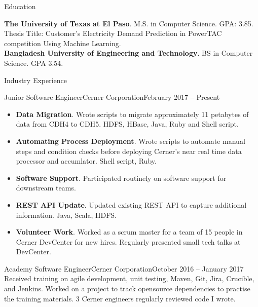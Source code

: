 \documentclass[]{mcdowellcv}
\begin{document}
	\makeheader
	
	
	\begin{cvsection}{Education}
		\begin{cvsubsection}{}{}{}
				\textbf{The University of Texas at El Paso}. M.S. in Computer Science.  GPA: 3.85. \\
				Thesis Title: Customer's Electricity Demand Prediction in PowerTAC competition Using Machine Learning. \\
				\textbf{Bangladesh University of Engineering and Technology}. BS in Computer Science. GPA 3.54.  
		\end{cvsubsection}
	\end{cvsection}

	\begin{cvsection}{Industry Experience}
		\begin{cvsubsection}{Junior Software Engineer}{Cerner Corporation}{February 2017 -- Present}
			\begin{itemize}
				\item \textbf{Data Migration}. Wrote scripts to migrate approximately 11 petabytes of data from CDH4 to CDH5. HDFS, HBase, Java, Ruby and Shell script.		
				\item \textbf{Automating Process Deployment}. Wrote scripts to automate manual steps and condition checks before deploying Cerner's near real time data processor and accumlator. Shell script, Ruby.
				\item \textbf{Software Support}. Participated routinely on software support for downstream teams. 
				\item \textbf{REST API Update}. Updated existing REST API to capture additional information. Java, Scala, HDFS. 
				\item \textbf{Volunteer Work}. Worked as a scrum master for a team of 15 people in Cerner DevCenter for new hires. Regularly presented small tech talks at DevCenter. 
			\end{itemize}
		\end{cvsubsection}		
		\begin{cvsubsection}{Academy Software Engineer}{Cerner Corporation}{October 2016 -- January 2017}	
			Received training on agile development, unit testing, Maven, Git, Jira, Crucible, and Jenkins. Worked on a project to track opensource dependencies to practise the training materials. 3 Cerner engineers regularly reviewed code I wrote.
		\end{cvsubsection}
	\end{cvsection}
	
\end{document}
